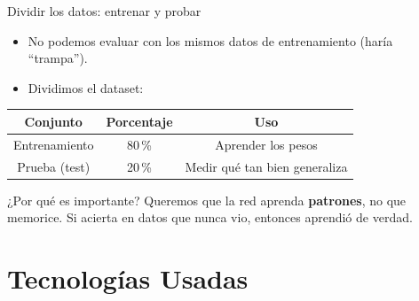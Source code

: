 \documentclass[10pt,aspectratio=169]{beamer}
\begin{document}
\begin{frame}{Dividir los datos: entrenar y probar}
  \begin{itemize}
    \item No podemos evaluar con los mismos datos de entrenamiento (haría ``trampa'').
    \item Dividimos el dataset:
  \end{itemize}
  \begin{center}
    \begin{tabular}{ccc}
      \toprule
      \textbf{Conjunto} & \textbf{Porcentaje} & \textbf{Uso} \\
      \midrule
      Entrenamiento & 80\,\% & Aprender los pesos \\
      Prueba (test) & 20\,\% & Medir qué tan bien generaliza \\
      \bottomrule
    \end{tabular}
  \end{center}
  \pause
  \begin{exampleblock}{¿Por qué es importante?}
    Queremos que la red aprenda \textbf{patrones}, no que memorice.
    Si acierta en datos que nunca vio, entonces aprendió de verdad.
  \end{exampleblock}
\end{frame}

\section{Tecnologías Usadas}
\end{document}
